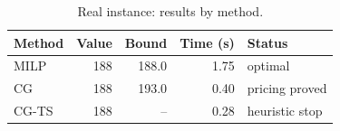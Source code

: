 \begin{table}[!ht]
\centering
\caption{Real instance: results by method.\label{tab8}}
\small
\begin{tabular*}{\columnwidth}{@{\extracolsep\fill}lrrrl@{\extracolsep\fill}}
\toprule
\textbf{Method} & \textbf{Value} & \textbf{Bound} & \textbf{Time (s)} & \textbf{Status} \\
\midrule
MILP & 188 & 188.0 & 1.75 & optimal \\
CG & 188 & 193.0 & 0.40 & pricing proved \\
CG-TS & 188 & -- & 0.28 & heuristic stop \\
\bottomrule
\end{tabular*}
\end{table}
